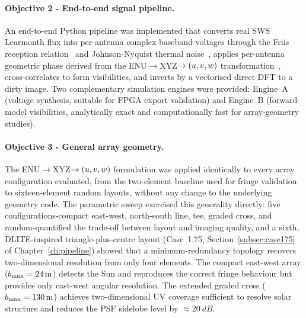\paragraph{Objective 2 - End-to-end signal pipeline.}
An end-to-end Python pipeline was implemented that converts real SWS Learmonth flux
into per-antenna complex baseband voltages through the Friis reception relation~\citep{friis1946,tms2017} and
Johnson-Nyquist thermal noise~\citep{nyquist1928}, applies per-antenna geometric phase derived from the
ENU$\rightarrow$XYZ$\rightarrow(u,v,w)$ transformation~\citep{tms2017}, cross-correlates to form
visibilities, and inverts by a vectorised direct DFT to a dirty image. Two complementary
simulation engines were provided: Engine~A (voltage synthesis, suitable for FPGA export
validation) and Engine~B (forward-model visibilities, analytically exact and
computationally fast for array-geometry studies).

\paragraph{Objective 3 - General array geometry.}
The ENU$\rightarrow$XYZ$\rightarrow(u,v,w)$ formulation was applied identically to every
array configuration evaluated, from the two-element baseline used for fringe validation
to sixteen-element random layouts, without any change to the underlying geometry code.
The parametric sweep exercised this generality directly: five configurations-compact
east-west, north-south line, tee, graded cross, and random-quantified the trade-off
between layout and imaging quality, and a sixth, DLITE-inspired triangle-plus-centre layout
(Case~1.75, Section~\ref{subsec:case175} of Chapter~\ref{ch:pipeline}) showed that a
minimum-redundancy topology recovers two-dimensional resolution from only four elements.
The compact east-west array ($b_{\rm max}=\SI{24}{\metre}$) detects the Sun and
reproduces the correct fringe behaviour but provides only east-west angular resolution.
The extended graded cross ($b_{\rm max}=\SI{130}{\metre}$) achieves two-dimensional
UV coverage sufficient to resolve solar structure and reduces the PSF sidelobe level by
$\approx20~\si{dB}$.

